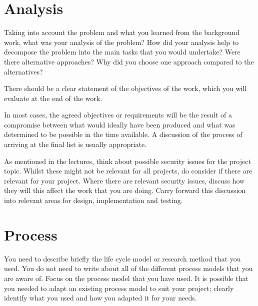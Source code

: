\section{Analysis}
Taking into account the problem and what you learned from the background work,
what was your analysis of the problem? How did your analysis help to decompose
the problem into the main tasks that you would undertake? Were there alternative
approaches? Why did you choose one approach compared to the alternatives?

There should be a clear statement of the objectives of the work, which you will
evaluate at the end of the work.

In most cases, the agreed objectives or requirements will be the result of a compromise
between what would ideally have been produced and what was determined to be possible in
 the time available. A discussion of the process of arriving at the final list is usually appropriate.

As mentioned in the lectures, think about possible security issues for the project topic.
 Whilst these might not be relevant for all projects, do consider if there are relevant
  for your project. Where there are relevant security issues, discuss how they will
  this affect the work that you are doing. Carry forward this discussion into relevant
   areas for design, implementation and testing.

\section{Process}
You need to describe briefly the life cycle model or research method that you used. You
 do not need to write about all of the different process models that you are aware of.
 Focus on the process model that you have used. It is possible that you needed to adapt
 an existing process model to suit your project; clearly identify what you used and how
 you adapted it for your needs.
